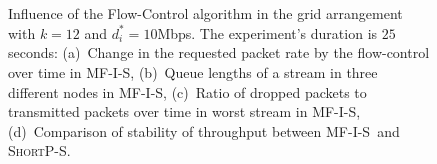 \documentclass[12pt]{article}
\newenvironment{proof sketch}[1]{\noindent {\emph{Proof sketch of #1:}}}{\hfill \qed}
\newcommand{\algA}{\textsc{MF-I-S}}
\newcommand{\algBS}{\textsc{ShortP-S}}
\begin{document}
\begin{figure}%
      \centering
        \\
        \\
        \caption{Influence of the Flow-Control algorithm in  the grid arrangement with $k=12$ and $d^*_i=10$Mbps. The experiment's duration is $25$ seconds: (a)~Change in the requested packet rate by the flow-control over time in \algA , (b)~Queue lengths of a stream in three different nodes in \algA , (c)~Ratio of dropped packets to transmitted packets over time in worst stream in \algA , (d)~Comparison of stability of throughput between \algA\ and \algBS.
        }
    \label{fig:fcbig}
     \end{figure}
\end{document}
